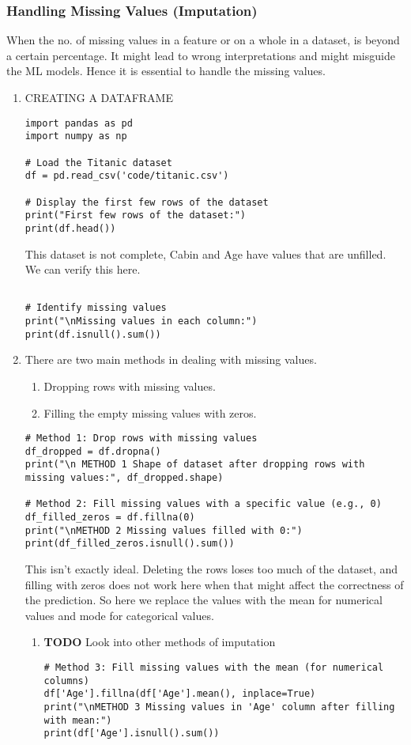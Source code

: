 \documentclass[11pt]{article}
\begin{document}
\subsubsection{Handling Missing Values (Imputation)}
\label{sec:org6272904}
When the no. of missing values in a feature or on a whole in a dataset, is beyond a certain percentage. It might lead to wrong interpretations and might misguide the ML models.
Hence it is essential to handle the missing values.
\begin{enumerate}
\item CREATING A DATAFRAME
\label{sec:org9b75e56}
\begin{verbatim}
import pandas as pd
import numpy as np

# Load the Titanic dataset
df = pd.read_csv('code/titanic.csv')

# Display the first few rows of the dataset
print("First few rows of the dataset:")
print(df.head())
\end{verbatim}

This dataset is not complete, Cabin and Age have values that are unfilled. We can verify this here.
\begin{verbatim}

# Identify missing values
print("\nMissing values in each column:")
print(df.isnull().sum())

\end{verbatim}
\item There are two main methods in dealing with missing values.
\label{sec:org59a8874}
\begin{enumerate}
\item Dropping rows with missing values.
\item Filling the empty missing values with zeros.
\end{enumerate}
\begin{verbatim}
# Method 1: Drop rows with missing values
df_dropped = df.dropna()
print("\n METHOD 1 Shape of dataset after dropping rows with missing values:", df_dropped.shape)

# Method 2: Fill missing values with a specific value (e.g., 0)
df_filled_zeros = df.fillna(0)
print("\nMETHOD 2 Missing values filled with 0:")
print(df_filled_zeros.isnull().sum())

\end{verbatim}

This isn't exactly ideal. Deleting the rows loses too  much of the dataset, and filling with zeros does not work here when that might affect the correctness of the prediction.
So here we replace the values with the mean for numerical values and mode for categorical values.
\begin{enumerate}
\item {\bfseries\sffamily TODO} Look into other methods of imputation
\label{sec:org5ed2d52}
\begin{verbatim}
# Method 3: Fill missing values with the mean (for numerical columns)
df['Age'].fillna(df['Age'].mean(), inplace=True)
print("\nMETHOD 3 Missing values in 'Age' column after filling with mean:")
print(df['Age'].isnull().sum())


\end{verbatim}
\end{enumerate}
\end{enumerate}
\end{document}
